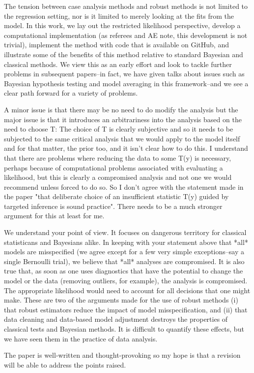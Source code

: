 \documentclass{article}
\newcommand{\response}[1]{{\color{blue}#1}}
\begin{document}
{The tension between case analysis methods and robust methods is not limited to the regression setting, nor is it limited to merely looking at the fits from the model.  In this work, we lay out the restricted likelihood perspective, develop a computational implementation (as referees and AE note, this development is not trivial), implement the method with code that is available on GitHub, and illustrate some of the benefits of this method relative to standard Bayesian and classical methods.  We view this as an early effort and look to tackle further problems in subsequent papers--in fact, we have given talks about issues such as Bayesian hypothesis testing and model averaging in this framework--and we see a clear path forward for a variety of problems.}


A minor issue is that there may be no need to do modify the analysis but the major issue is that it introduces an arbitrariness into the analysis based on the need to choose T: The choice of T is clearly subjective and so it needs to be subjected to the same critical analysis that we would apply to the model itself and for that matter, the prior too, and it isn't clear how to do this. I understand that there are
problems where reducing the data to some T(y) is necessary, perhaps because of computational problems associated with evaluating a likelihood, but this is clearly a compromised analysis and not one we would recommend unless forced to do so. So I don't agree with the statement made in the paper "that deliberate choice of an insufficient statistic T(y) guided by targeted inference is sound practice". There needs to be a much stronger argument for this at least for me.

\response{We understand your point of view.  It focuses on dangerous territory for classical statisticans and Bayesians alike.  In keeping with your statement above that *all* models are misspecified (we agree except for a few very simple exceptions--say a single Bernoulli trial), we believe that *all* analyses are compromised.  It is also true that, as soon as one uses diagnostics that have the potential to change the model or the data (removing outliers, for example), the analysis is compromised.  The appropriate likelihood would need to account for all decisions that one might make.  These are two of the arguments made for the use of robust methods (i) that robust estimators reduce the impact of model misspecification, and (ii) that data cleaning and data-based model adjustment destroys the properties of classical tests and Bayesian methods.  It is difficult to quantify these effects, but we have seen them in the practice of data analysis.}  

The paper is well-written and thought-provoking so my hope is that a revision will be able to address the points raised.
\end{document}
